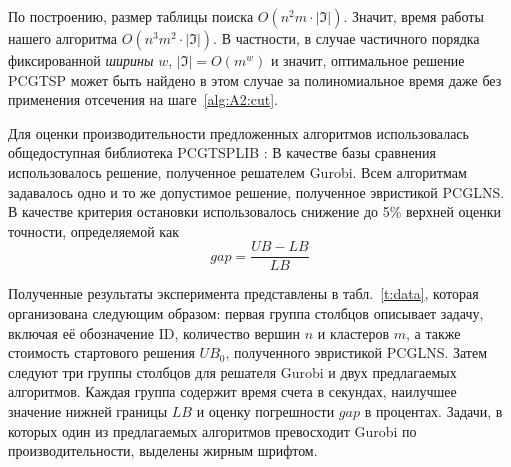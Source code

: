 По построению,
размер таблицы поиска
$O(n^2m\cdot |\mathfrak I|)$.
Значит, время работы нашего алгоритма
$O(n^3m^2\cdot |\mathfrak I|)$.
В частности,
в случае частичного порядка фиксированной {\it ширины}
\autocite{Steiner-1990}
$w$, $|\mathfrak I|=O(m^w)$
и значит,
оптимальное решение
PCGTSP
может быть найдено в этом случае за полиномиальное время
даже без применения отсечения на шаге~\ref{alg:A2:cut}.

Для оценки производительности предложенных алгоритмов
использовалась общедоступная библиотека
PCGTSPLIB
\autocite{SALMAN2020163}:
В качестве базы сравнения использовалось решение,
полученное решателем Gurobi.
Всем алгоритмам задавалось одно и то же
допустимое решение,
полученное эвристикой
PCGLNS.
В качестве критерия остановки
использовалось снижение до 5\%
верхней оценки точности,
определяемой как
$$
gap = \frac{UB - LB}{LB}
$$

Полученные результаты эксперимента
представлены в табл.~\ref{t:data},
которая организована следующим образом:
первая группа столбцов описывает
задачу,
включая её обозначение ID,
количество вершин $n$
и кластеров $m$,
а также стоимость стартового решения $UB_0$,
полученного эвристикой PCGLNS.
Затем следуют три группы столбцов
для решателя Gurobi
и двух предлагаемых алгоритмов.
Каждая группа содержит время
счета в секундах,
наилучшее значение нижней границы
$LB$
и оценку погрешности $gap$
в процентах.
Задачи,
в которых один из предлагаемых
алгоритмов превосходит Gurobi по производительности,
выделены жирным шрифтом.


